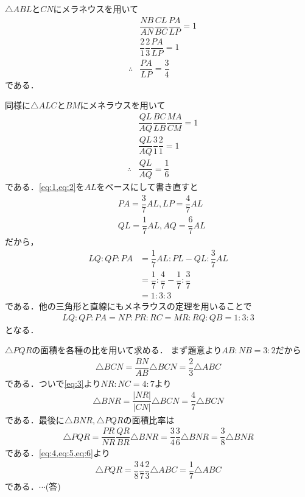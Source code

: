 \documentclass[../../main.tex]{subfiles}
\begin{document}
$\triangle ABL$と$CN$にメラネウスを用いて
\begin{align}
  & \dfrac{NB}{AN}\dfrac{CL}{BC}\dfrac{PA}{LP}=1 \\
  & \dfrac{2}{1}\dfrac{2}{3}\dfrac{PA}{LP}=1 \\
  \quad\therefore
  & \dfrac{PA}{LP}=\dfrac{3}{4}\label{eq:1}
\end{align}
である．

同様に$\triangle ALC$と$BM$にメネラウスを用いて
\begin{align}
  & \dfrac{QL}{AQ}\dfrac{BC}{LB}\dfrac{MA}{CM} = 1 \\
  & \dfrac{QL}{AQ}\dfrac{3}{1}\dfrac{2}{1} = 1 \\
  \quad\therefore
  & \dfrac{QL}{AQ}=\dfrac{1}{6} \label{eq:2}
\end{align}
である．\cref{eq:1,eq:2}を$AL$をベースにして書き直すと
\begin{align}
  & PA = \dfrac{3}{7} AL, LP = \dfrac{4}{7} AL \\
  & QL = \dfrac{1}{7} AL, AQ = \dfrac{6}{7} AL
\end{align}
だから，
\begin{align}
  LQ:QP:PA
  &= \dfrac{1}{7}AL:PL-QL:\dfrac{3}{7}AL \\
  &= \dfrac{1}{7}:\dfrac{4}{7}-\dfrac{1}{7}: \dfrac{3}{7}\\
  &= 1:3: 3
\end{align}
である．他の三角形と直線にもメネラウスの定理を用いることで
\begin{align}
  LQ:QP:PA
  =NP:PR:RC
  =MR:RQ:QB
  =1:3:3\label{eq:3}
\end{align}
となる．

$\triangle PQR$の面積を各種の比を用いて求める．
まず題意より$AB:NB=3:2$だから
\begin{align}
  \triangle BCN = \dfrac{BN}{AB}\triangle BCN = \dfrac{2}{3}\triangle ABC \label{eq:4}
\end{align}
である．ついで\cref{eq:3}より$NR:NC=4:7$より
\begin{align}
  \triangle BNR = \dfrac{|NR|}{|CN|} \triangle BCN = \dfrac{4}{7}\triangle BCN \label{eq:5}
\end{align}
である．最後に$\triangle BNR, \triangle PQR$の面積比率は
\begin{align}
  \triangle PQR
  = \dfrac{PR}{NR}\dfrac{QR}{BR}\triangle BNR
  = \dfrac{3}{4}\dfrac{3}{6}\triangle BNR
  = \dfrac{3}{8}\triangle BNR \label{eq:6}
\end{align}
である．\cref{eq:4,eq:5,eq:6}より
\begin{align}
  \triangle PQR
  = \dfrac{3}{8} \dfrac{4}{7} \dfrac{2}{3} \triangle ABC
  = \dfrac{1}{7}\triangle ABC
\end{align}
である．$\cdots$(答)


\newpage
\end{document}
